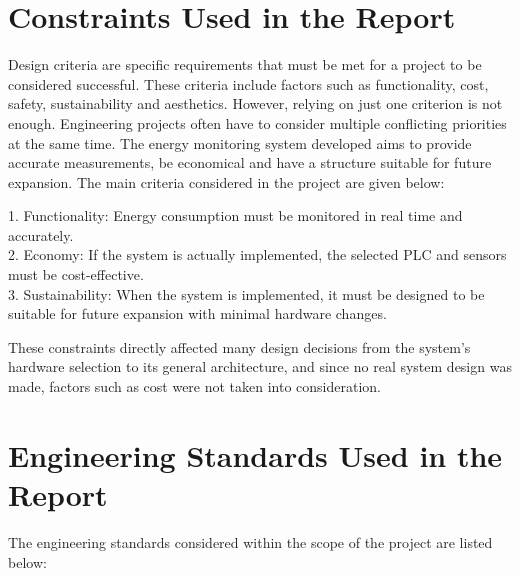 
\label{Multiobjectivecriteria_and_EngineeringStandards} %
\thesisspacing %





\section*{Constraints Used in the Report}

Design criteria are specific requirements that must be met for a project to be considered successful. These criteria include factors such as functionality, cost, safety, sustainability and aesthetics. However, relying on just one criterion is not enough. Engineering projects often have to consider multiple conflicting priorities at the same time.
The energy monitoring system developed aims to provide accurate measurements, be economical and have a structure suitable for future expansion.
The main criteria considered in the project are given below:


1. Functionality: Energy consumption must be monitored in real time and accurately.\\
2. Economy: If the system is actually implemented, the selected PLC and sensors must be cost-effective.\\
3. Sustainability: When the system is implemented, it must be designed to be suitable for future expansion with minimal hardware changes.

These constraints directly affected many design decisions from the system's hardware selection to its general architecture, and since no real system design was made, factors such as cost were not taken into consideration.


\section*{Engineering Standards Used in the Report}

The engineering standards considered within the scope of the project are listed below:

